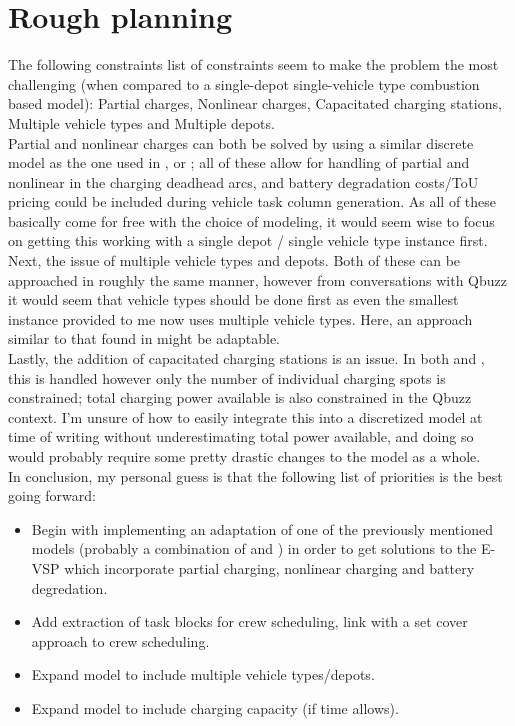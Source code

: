 \documentclass[]{article}
\begin{document}
\section{Rough planning}
The following constraints list of constraints seem to make the problem the most challenging (when compared to a single-depot single-vehicle type combustion based model): Partial charges, Nonlinear charges, Capacitated charging stations, Multiple vehicle types and Multiple depots. \\
Partial and nonlinear charges can both be solved by using a similar discrete model as the one used in , \citet{Zhang2021} or ; all of these allow for handling of partial and nonlinear in the charging deadhead arcs, and battery degradation costs/ToU pricing could be included during vehicle task column generation. As all of these basically come for free with the choice of modeling, it would seem wise to focus on getting this working with a single depot / single vehicle type instance first. \\
Next, the issue of multiple vehicle types and depots. Both of these can be approached in roughly the same manner, however from conversations with Qbuzz it would seem that vehicle types should be done first as even the smallest instance provided to me now uses multiple vehicle types. Here, an approach similar to that found in \citet{Huisman2005} might be adaptable. \\
Lastly, the addition of capacitated charging stations is an issue. In both \citet{Zhang2021} and , this is handled however only the number of individual charging spots is constrained; total charging power available is also constrained in the Qbuzz context. I'm unsure of how to easily integrate this into a discretized model at time of writing without underestimating total power available, and doing so would probably require some pretty drastic changes to the model as a whole. \\
In conclusion, my personal guess is that the following list of priorities is the best going forward:
\begin{itemize}
  \item Begin with implementing an adaptation of one of the previously mentioned models (probably a combination of  and ) in order to get solutions to the E-VSP which incorporate partial charging, nonlinear charging and battery degredation.
  \item Add extraction of task blocks for crew scheduling, link with a set cover approach to crew scheduling.
  \item Expand model to include multiple vehicle types/depots.
  \item Expand model to include charging capacity (if time allows).
\end{itemize}
\end{document}
